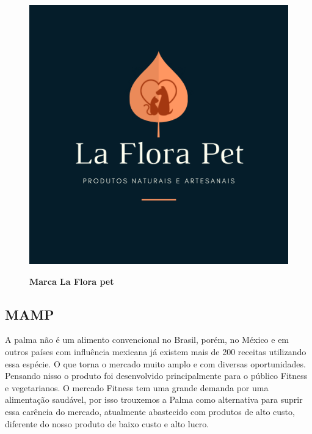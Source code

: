 \begin{figure}[H]
\centering
\caption{\textbf{Marca La Flora pet}}
\includegraphics[scale=5]{Imagens/laflorapet.png}
\label{figura_24}
\end{figure}


\subsection{MAMP}

A palma não é um alimento convencional no Brasil, porém, no México e em outros países com influência mexicana já existem mais de 200 receitas utilizando essa espécie. O que torna o mercado muito amplo e com diversas oportunidades. Pensando nisso o produto foi desenvolvido principalmente para o público Fitness e vegetarianos. O mercado Fitness tem uma grande demanda por uma alimentação saudável, por isso trouxemos a Palma como alternativa para suprir essa carência do mercado, atualmente abastecido com produtos de alto custo, diferente do nosso produto de baixo custo e alto lucro.

